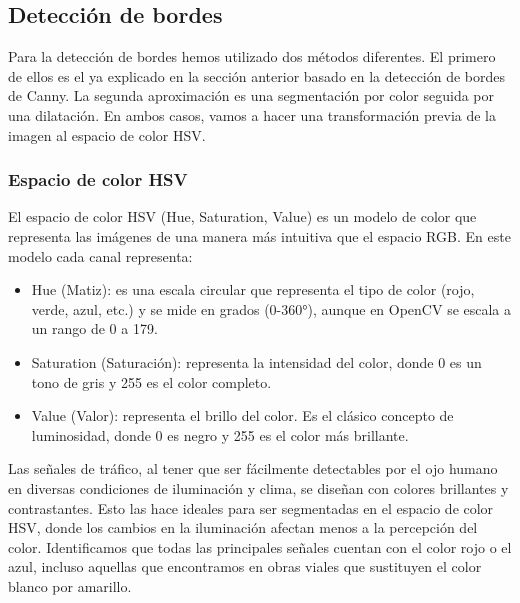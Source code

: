 \documentclass[11pt,a4paper]{article}
\begin{document}
\subsection{Detección de bordes}
Para la detección de bordes hemos utilizado dos métodos diferentes. El primero de ellos es el ya explicado en la
sección anterior basado en la detección de bordes de Canny. La segunda aproximación es una segmentación por color seguida
por una dilatación. En ambos casos, vamos a hacer una transformación previa de la imagen al espacio de color HSV.

\subsubsection{Espacio de color HSV}
El espacio de color HSV (Hue, Saturation, Value) \cite{wikipedia_hsv_modelo_color} es un modelo de color que representa las imágenes de una manera más intuitiva que el espacio RGB. 
En este modelo cada canal representa:

\begin{itemize}
    \item Hue (Matiz): es una escala circular que representa el tipo de color (rojo, verde, azul, etc.) y se mide en grados (0-360°), aunque en OpenCV se escala a un rango de 0 a 179.
    \item Saturation (Saturación): representa la intensidad del color, donde 0 es un tono de gris y 255 es el color completo.
    \item Value (Valor): representa el brillo del color. Es el clásico concepto de luminosidad, donde 0 es negro y 255 es el color más brillante.
\end{itemize}

Las señales de tráfico, al tener que ser fácilmente detectables por el ojo humano en diversas condiciones de iluminación y clima, se diseñan con colores brillantes y contrastantes. 
Esto las hace ideales para ser segmentadas en el espacio de color HSV, donde los cambios en la iluminación afectan menos a la percepción del color.
Identificamos que todas las principales señales cuentan con el color rojo o el azul, incluso aquellas que encontramos en obras viales que sustituyen el color blanco por amarillo.
\end{document}
